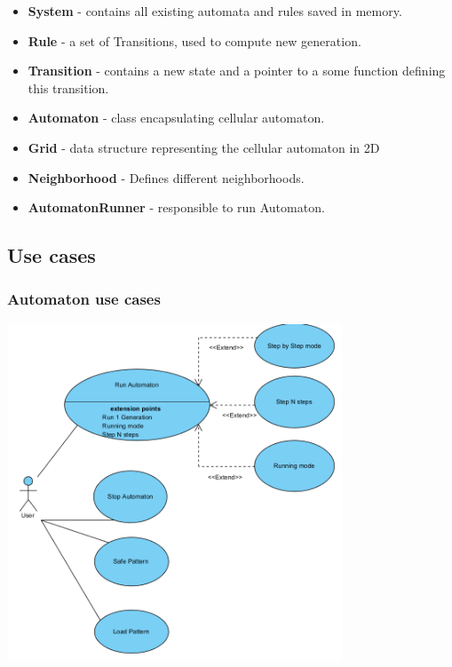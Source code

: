 \documentclass{article}
\begin{document}
	\begin{itemize}
		\item {\bf System} - contains all existing automata and rules saved in memory.
		\item {\bf Rule} - a set of Transitions, used to compute new generation.
		\item {\bf Transition} - contains a new state and a pointer to a some function defining this transition.
		\item {\bf Automaton} - class encapsulating cellular automaton.
		\item {\bf Grid} - data structure representing the cellular automaton in 2D
		\item {\bf Neighborhood} - Defines different neighborhoods.
		\item {\bf AutomatonRunner} - responsible to run Automaton.
	\end{itemize}
	
	\subsection{Use cases}

	\subsubsection{Automaton use cases}
		\hspace{-60pt}
		\includegraphics[width=100mm, height=100mm]{images/use_automaton_d.png} \\	
	
\end{document}
